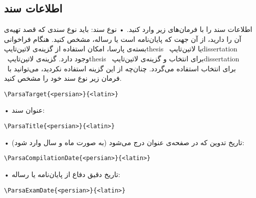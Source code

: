 \documentclass[%
12pt,%
twoside, %
openany, %
notitlepage,%
fleqn,%
]{article}
\numberwithin{equation}{section} %
\begin{document}
\subsection{اطلاعات سند} \label{ParsaInf}
اطلاعات سند را با فرمان‌های زیر وارد کنید\@. 
• نوع سند: باید نوع سندی که قصد تهیه‌‌ی آن را دارید، از آن جهت که پایان‌نامه است یا رساله، مشخص کنید\@. هنگام فراخوانی بسته‌ی پارسا، امکان استفاده از گزینه‌ی ‌لاتین{‌تایپ{thesis}} ~یا ‌لاتین{‌تایپ{dissertation}} ~وجود دارد\@. گزینه‌ی ‌لاتین{‌تایپ{thesis}} ~برای انتخاب  و گزینه‌ی ‌لاتین{‌تایپ{dissertation}} ~برای انتخاب  استفاده می‌گردد\@. چنان‌چه از این گزینه استفاده نکردید، می‌توانید با فرمان زیر نوع سند خود را مشخص کنید\@.
\begin{latin}\begin{verbatim}
\ParsaTarget{<persian>}{<latin>}
\end{verbatim} \end{latin}
• عنوان سند:
\begin{latin}\begin{verbatim}
\ParsaTitle{<persian>}{<latin>}
\end{verbatim} \end{latin}
• تاریخ تدوین که در صفحه‌ی عنوان درج می‌شود (به صورت ماه و سال وارد شود):
\begin{latin}\begin{verbatim}
\ParsaCompilationDate{<persian>}{<latin>}
\end{verbatim} \end{latin}
• تاریخ دقیق دفاع از پایان‌نامه یا رساله:
\begin{latin}\begin{verbatim}
\ParsaExamDate{<persian>}{<latin>}
\end{verbatim} \end{latin}
\end{document}
